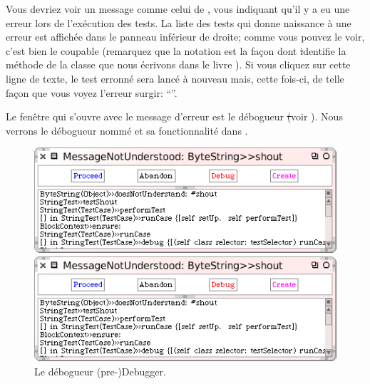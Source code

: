\documentclass[a4paper,10pt,twoside]{book}
\begin{document}
Vous devriez voir un message comme celui de
, vous indiquant qu'il y a eu une erreur
lors de l'ex\'ecution des tests. La liste des tests qui donne
naissance \`a une erreur est affich\'ee dans le panneau inf\'erieur de
droite; comme vous pouvez le voir, c'est bien
 le coupable
(remarquez que la notation  est la fa\c{c}on dont \st
identifie la m\'ethode de la classe  que nous
\'ecrivons dans le livre ).
Si vous cliquez sur cette ligne de texte, le test erronn\'e sera
lanc\'e \`a nouveau mais, cette fois-ci, de telle fa\c{c}on que vous
voyez l'erreur surgir:
``''.

Le fen\^etre qui s'ouvre avec le message d'erreur est le d\'ebogueur \st (voir ).
Nous verrons le d\'ebogueur nomm\'e  et sa
fonctionnalit\'e dans .

\begin{figure}[hbt]
\ifluluelse
	{\centerline {\includegraphics[width=\textwidth]{Predebugger}}}
	{\centerline {\includegraphics[scale=0.7]{Predebugger}}}
\caption{Le d\'ebogueur (pre-)Debugger.}
\label{fig:predebugger}
\end{figure}
\end{document}
